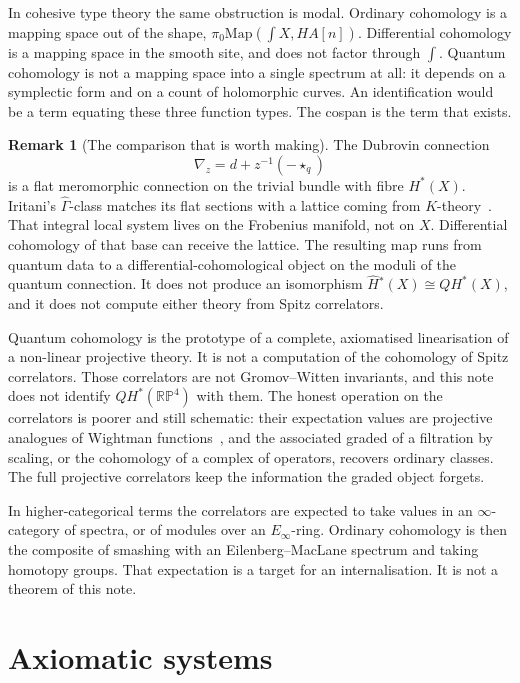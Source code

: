 \documentclass{article}
\theoremstyle{definition}
\newtheorem{remark}{Remark}
\newcommand{\RP}{\mathbb{RP}}
\newcommand{\shape}{\int}
\begin{document}
In cohesive type theory the same obstruction is modal.  Ordinary cohomology
is a mapping space out of the shape, \(\pi_0\mathrm{Map}(\shape X, HA[n])\).
Differential cohomology is a mapping space in the smooth site, and does not
factor through \(\shape\).  Quantum cohomology is not a mapping space into a
single spectrum at all: it depends on a symplectic form and on a count of
holomorphic curves.  An identification would be a term equating these three
function types.  The cospan is the term that exists.

\begin{remark}[The comparison that is worth making]
The Dubrovin connection
\[
  \nabla_z
    = d + z^{-1}(-\star_q)
\]
is a flat meromorphic connection on the trivial bundle with fibre \(H^*(X)\).
Iritani's \(\widehat{\Gamma}\)-class matches its flat sections with a lattice
coming from \(K\)-theory~\cite{Iritani}.  That integral local system lives on
the Frobenius manifold, not on \(X\).  Differential cohomology of that base
can receive the lattice.  The resulting map runs from quantum data to a
differential-cohomological object on the moduli of the quantum connection.
It does not produce an isomorphism \(\widehat{H}{}^*(X)\cong QH^*(X)\), and it
does not compute either theory from Spitz correlators.
\end{remark}

Quantum cohomology is the prototype of a complete, axiomatised linearisation
of a non-linear projective theory.  It is not a computation of the cohomology
of Spitz correlators.  Those correlators are not Gromov--Witten invariants,
and this note does not identify \(QH^*(\RP^4)\) with them.  The honest
operation on the correlators is poorer and still schematic: their expectation
values are projective analogues of Wightman functions~\cite{Wightman}, and the
associated graded of a filtration by scaling, or the cohomology of a complex
of operators, recovers ordinary classes.  The full projective correlators keep
the information the graded object forgets.

In higher-categorical terms the correlators are expected to take values in an
\(\infty\)-category of spectra, or of modules over an \(E_\infty\)-ring.
Ordinary cohomology is then the composite of smashing with an
Eilenberg--MacLane spectrum and taking homotopy groups.  That expectation is
a target for an internalisation.  It is not a theorem of this note.

\section{Axiomatic systems}
\end{document}
